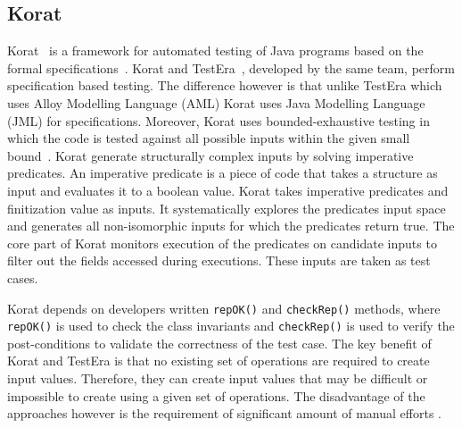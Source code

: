 \subsection{Korat} %
Korat~\cite{boyapati2002korat} is a framework for automated testing of Java programs based on the formal specifications~\cite{chang1999structural}. Korat and TestEra~\cite{marinov2001testera}, developed by the same team, perform specification based testing. The difference however is that unlike TestEra which uses Alloy Modelling Language (AML) Korat uses Java Modelling Language (JML) for specifications. Moreover, Korat uses bounded-exhaustive testing in which the code is tested against all possible inputs within the given small bound~\cite{khurshid2001checking}. Korat generate structurally complex inputs by solving imperative predicates. An imperative predicate is a piece of code that takes a structure as input and evaluates it to a boolean value. Korat takes imperative predicates and finitization value as inputs. It systematically explores the predicates input space and generates all non-isomorphic inputs for which the predicates return true. The core part of Korat monitors execution of the predicates on candidate inputs to filter out the fields accessed during executions. These inputs are taken as test cases. 

Korat depends on developers written \verb+repOK()+ and \verb+checkRep()+ methods, where \verb+repOK()+ is used to check the class invariants and \verb+checkRep()+ is used to verify the post-conditions to validate the correctness of the test case. The key benefit of Korat and TestEra is that no existing set of operations are required to create input values. Therefore, they can create input values that may be difficult or impossible to create using a given set of operations. The disadvantage of the approaches however is the requirement of significant amount of manual efforts \cite{pacheco2009directed}.    












